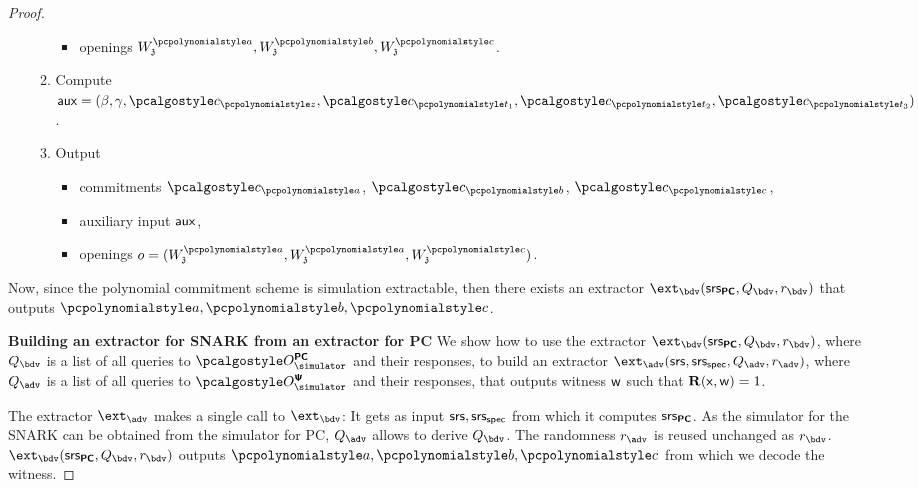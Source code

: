 \documentclass[runningheads,11pt]{llncs}
\begin{document}
\begin{proof}
\begin{enumerate}
\begin{enumerate}
\begin{itemize}
      \item openings $W_\chz^{\p{a}}, W_\chz^{\p{b}}, W_\chz^{\p{c}}$.
      \end{itemize}
    \item Compute
      $\aux = (\beta, \gamma, \cp{z}, \cp{t_1},
      \cp{t_2}, \cp{t_3})$. 
    \item Output
      \begin{itemize}
      \item commitments $\cp{a}$, $\cp{b}$, $\cp{c}$,
      \item auxiliary input $\mathsf{aux}$,
      \item openings $o = (W_\chz^{\p{a}}, W_\chz^{\p{a}},  W_\chz^{\p{c}})$.
      \end{itemize}
    \end{enumerate}
  \end{enumerate}

  Now, since the polynomial commitment scheme is simulation
  extractable, then there exists an extractor
  $\ext_{\bdv}(\srs_{\PCOM}, \qbdv, \rbdv)$ that outputs $\p{a}, \p{b}, \p{c}$.\smallskip

\noindent\textbf{Building an extractor for SNARK from an extractor for PC}
  We show how to use the extractor
  $\ext_\bdv(\srs_{\PCOM}, \qbdv, \rbdv)$, where $\qbdv$ is a list of all
  queries to $\oraclespcom$ and their responses, to build an extractor
  $\ext_\adv(\srs, \srss, \qadv, \radv)$, where $\qadv$ is a list of all queries
  to $\oraclesps$ and their responses, that outputs witness $\mathsf{w}$ such that
  $\mathbf{R}(\mathsf{x}, \mathsf{w}) = 1$.


  The extractor $\ext_\adv$ makes a single call to
  $\ext_{\bdv}$: It gets as input $\mathsf{srs}, \mathsf{srs_{spec}}$ from which it computes
  $\mathsf{srs}_{{\bm{\mathsf{PC}}}}$. As the simulator for the SNARK can be obtained from the simulator for PC, $\qadv$ allows to derive $\qbdv$.  The
  randomness $\radv$ is reused unchanged as $\rbdv$.
  $\ext_{\bdv}(\srs_{\PCOM}, \qbdv, \rbdv)$ outputs $\p{a}, \p{b}, \p{c}$ from
  which we decode the witness.

\end{proof}
\end{document}
